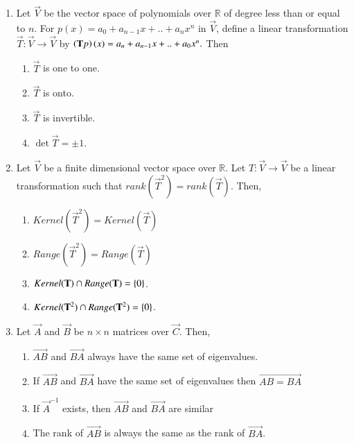 \renewcommand{\theequation}{\theenumi}
\renewcommand{\thefigure}{\theenumi}
\begin{enumerate}[label=\thesection.\arabic*.,ref=\thesection.\theenumi]

\item Let $\vec{V}$ be the vector space of polynomials over $\mathbb{R}$ of degree less than or equal to $n$. For $p(x)=a_0+a_{n-1}x+..+a_nx^{n}$ in $\vec{V}$, define a linear transformation $\vec{T}:\vec{V}\rightarrow \vec{V}$ by $\left(\mathbf{T}p\right)(x)=a_n+a_{n-1}x+..+a_0x^n.$ Then \\
\begin{enumerate}
    \item $\vec{T}$ is one to one.
    \item $\vec{T}$ is onto.
    \item $\vec{T}$ is invertible.
    \item $\det{\vec{T}}=\pm 1$.
\end{enumerate}
%
%
\solution

%
\item Let $\vec{V}$ be a finite dimensional vector space over $\mathbb{R}$. Let $T:\vec{V}\rightarrow\vec{V}$ be a linear transformation such that $rank(\vec{T}^2)=rank(\vec{T})$. Then,
\begin{enumerate}
    \item $Kernel(\vec{T}^2)=Kernel(\vec{T})$
    \item $Range(\vec{T}^2)=Range(\vec{T})$
    \item $Kernel(\mathbf{T})\cap Range(\mathbf{T})=\left\{0\right\}$.
    \item $Kernel(\mathbf{T}^2)\cap Range(\mathbf{T}^2)=\left\{0\right\}$.
\end{enumerate}
%
\solution

\item 
Let $\vec{A}$ and $\vec{B}$ be $n \times n$ matrices over $\vec{C}$. Then,
\begin{enumerate}
	\item $\vec{AB}$ and $\vec{BA}$ always have the same set of eigenvalues.
	\item If $\vec{AB}$ and $\vec{BA}$ have the same set of eigenvalues then $\vec{AB=BA}$
	\item If $\vec{A}^{-1}$ exists, then $\vec{AB}$ and $\vec{BA}$ are similar
	\item The rank of $\vec{AB}$  is always the same as the rank of $\vec{BA}$.
\end{enumerate}

\end{enumerate}
